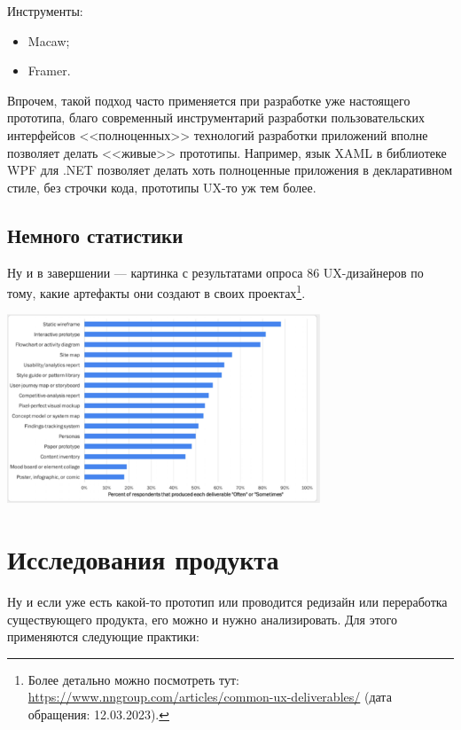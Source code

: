 \documentclass{../../text-style}
\begin{document}
Инструменты:

\begin{itemize}
    \item Macaw;
    \item Framer.
\end{itemize}

Впрочем, такой подход часто применяется при разработке уже настоящего прототипа, благо современный инструментарий разработки пользовательских интерфейсов <<полноценных>> технологий разработки приложений вполне позволяет делать <<живые>> прототипы. Например, язык XAML в библиотеке WPF для .NET позволяет делать хоть полноценные приложения в декларативном стиле, без строчки кода, прототипы UX-то уж тем более.

\subsection{Немного статистики}

Ну и в завершении --- картинка с результатами опроса 86 UX-дизайнеров по тому, какие артефакты они создают в своих проектах\footnote{Более детально можно посмотреть тут: \url{https://www.nngroup.com/articles/common-ux-deliverables/} (дата обращения: 12.03.2023).}.

\begin{center}
    \includegraphics[width=0.7\textwidth]{statistics.png}
\end{center}

\section{Исследования продукта}

Ну и если уже есть какой-то прототип или проводится редизайн или переработка существующего продукта, его можно и нужно анализировать. Для этого применяются следующие практики:
\end{document}
